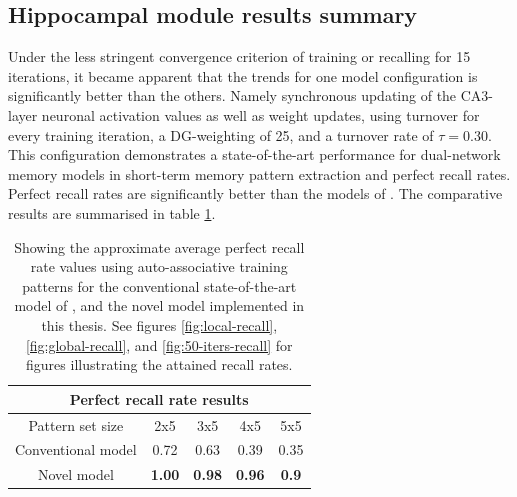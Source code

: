 \subsection{Hippocampal module results summary}

Under the less stringent convergence criterion of training or recalling for 15 iterations, it became apparent that the trends for one model configuration is significantly better than the others. Namely synchronous updating of the CA3-layer neuronal activation values as well as weight updates, using turnover for every training iteration, a DG-weighting of 25, and a turnover rate of $\tau=0.30$.
This configuration demonstrates a state-of-the-art performance for dual-network memory models in short-term memory pattern extraction and perfect recall rates. Perfect recall rates are significantly better than the models of \citep{Hattori2014, Hattori2010}. The comparative results are summarised in table \ref{table:comparison-perfect-recall-rates}.


\begin{table}[]
\centering
\caption{Showing the approximate average perfect recall rate values using auto-associative training patterns for the conventional state-of-the-art model of \citep{Hattori2014}, and the novel model implemented in this thesis. See figures \ref{fig:local-recall}, \ref{fig:global-recall}, and \ref{fig:50-iters-recall} for figures illustrating the attained recall rates.}
\label{table:comparison-perfect-recall-rates}
\begin{tabular}{|c|c|c|c|c|}
\hline
\multicolumn{5}{|c|}{Perfect recall rate results}                                         \\ \hline
Pattern set size   & 2x5           & 3x5           & 4x5           & 5x5           \\ \hline
Conventional model & 0.72 & 0.63 & 0.39 & 0.35 \\ \hline
Novel model        & \textbf{1.00} & \textbf{0.98} & \textbf{0.96} & \textbf{0.9}  \\ \hline
\end{tabular}
\end{table}

